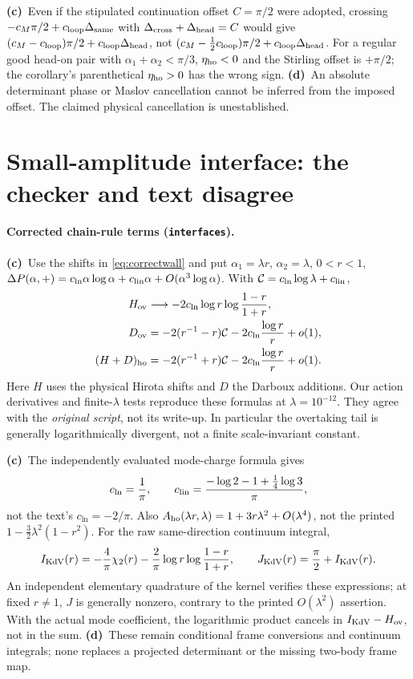 \documentclass[11pt,a4paper]{article}
\newcommand{\Lc}{\textbf{(c)}\ }
\newcommand{\Ld}{\textbf{(d)}\ }
\begin{document}
\Lc Even if the stipulated continuation offset $C=\pi/2$ were adopted,
crossing $-c_M\pi/2+c_{\rm loop}\Delta_{\rm same}$ with
$\Delta_{\rm cross}+\Delta_{\rm head}=C$ would give
$(c_M-c_{\rm loop})\pi/2+c_{\rm loop}\Delta_{\rm head}$,
not $(c_M-\tfrac12c_{\rm loop})\pi/2+c_{\rm loop}\Delta_{\rm head}$.
For a regular good head-on pair with $\alpha_1+\alpha_2<\pi/3$,
$\eta_{\rm ho}<0$ and the Stirling offset is $+\pi/2$; the corollary's
parenthetical $\eta_{\rm ho}>0$ has the wrong sign.
\Ld An absolute determinant phase or Maslov cancellation cannot be inferred
from the imposed offset. The claimed physical cancellation is unestablished.

\section{Small-amplitude interface: the checker and text disagree}
\paragraph{Corrected chain-rule terms (\texttt{interfaces}).}
\Lc Use the shifts in \eqref{eq:correctwall} and put
$\alpha_1=\lambda r$, $\alpha_2=\lambda$, $0<r<1$,
$\Delta P(\alpha,+)=c_{\ln}\alpha\log\alpha+c_{\rm lin}\alpha+
O(\alpha^3\log\alpha)$. With $\mathcal C=c_{\ln}\log\lambda+c_{\rm lin}$,
\begin{align}
 H_{\rm ov}&\longrightarrow
 -2c_{\ln}\log r\log\frac{1-r}{1+r},\\
 D_{\rm ov}&=-2(r^{-1}-r)\mathcal C
             -2c_{\ln}\frac{\log r}{r}+o(1),\\
 (H+D)_{\rm ho}&=-2(r^{-1}+r)\mathcal C
             -2c_{\ln}\frac{\log r}{r}+o(1).
 \label{eq:small}
\end{align}
Here $H$ uses the physical Hirota shifts and $D$ the Darboux additions.
Our action derivatives and finite-$\lambda$ tests reproduce these formulas
at $\lambda=10^{-12}$. They agree with the \emph{original script}, not its
write-up. In particular the overtaking tail is generally logarithmically
divergent, not a finite scale-invariant constant.

\Lc The independently evaluated mode-charge formula gives
\begin{equation}
 c_{\ln}=\frac1\pi,\qquad
 c_{\rm lin}=\frac{-\log2-1+\tfrac14\log3}{\pi},
\end{equation}
not the text's $c_{\ln}=-2/\pi$. Also
$A_{\rm ho}(\lambda r,\lambda)=1+3r\lambda^2+O(\lambda^4)$,
not the printed $1-\tfrac32\lambda^2(1-r^2)$.
For the raw same-direction continuum integral,
\begin{equation}
 I_{\rm KdV}(r)=-\frac4\pi\chi_2(r)
 -\frac2\pi\log r\log\frac{1-r}{1+r},\qquad
 J_{\rm KdV}(r)=\frac\pi2+I_{\rm KdV}(r).
\end{equation}
An independent elementary quadrature of the kernel verifies these expressions;
at fixed $r\ne1$, $J$ is generally nonzero, contrary to the printed
$O(\lambda^2)$ assertion. With the actual mode coefficient, the logarithmic
product cancels in $I_{\rm KdV}-H_{\rm ov}$, not in the sum.
\Ld These remain conditional frame conversions and continuum integrals;
none replaces a projected determinant or the missing two-body frame map.
\end{document}
